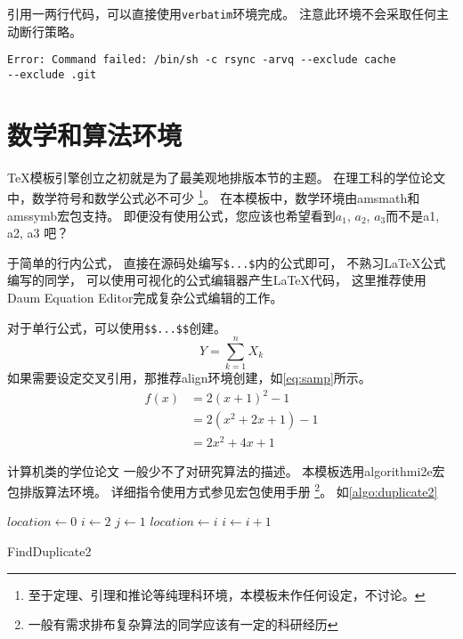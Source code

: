 引用一两行代码，可以直接使用\texttt{verbatim}环境完成。
注意此环境不会采取任何主动断行策略。
\begin{verbatim}
Error: Command failed: /bin/sh -c rsync -arvq --exclude cache
--exclude .git 
\end{verbatim}

\section{数学和算法环境}

\TeX 模板引擎创立之初就是为了最美观地排版本节的主题。
在理工科的学位论文中，数学符号和数学公式必不可少
\footnote{至于定理、引理和推论等纯理科环境，本模板未作任何设定，不讨论。}。
在本模板中，数学环境由amsmath和amssymb宏包支持。
即便没有使用公式，您应该也希望看到$a_1$, $a_2$, $a_3$而不是a1, a2, a3 吧？

于简单的行内公式，
直接在源码处编写\texttt{\$...\$}内的公式即可，
不熟习\LaTeX 公式编写的同学，
可以使用可视化的公式编辑器产生\LaTeX 代码，
这里推荐使用Daum Equation Editor完成复杂公式编辑的工作。

对于单行公式，可以使用\texttt{\$\$...\$\$}创建。
$$Y=\sum_{k=1}^n X_k$$
如果需要设定交叉引用，那推荐align环境创建，如\eqref{eq:samp}所示。
\begin{align}\label{eq:samp}
    f(x) & = 2(x + 1)^{2} - 1\\                  %
		 & = 2(x^{2} + 2x +1)-1\\
		 & = 2x^{2} + 4x + 1
\end{align}


计算机类的学位论文
一般少不了对研究算法的描述。
本模板选用algorithmi2e宏包排版算法环境。
详细指令使用方式参见宏包使用手册
\footnote{一般有需求排布复杂算法的同学应该有一定的科研经历}。
如\autoref{algo:duplicate2}

\begin{algorithm}
\DontPrintSemicolon
{}
$location \gets 0$\;
$i \gets 2$\;
 {
  $j \gets 1$\;
   {
     {
      $location \gets i$\;
    }
  }
  $i \gets i + 1$\;
}
\;
\caption{{\sc FindDuplicate2}}
\label{algo:duplicate2}
\end{algorithm}

